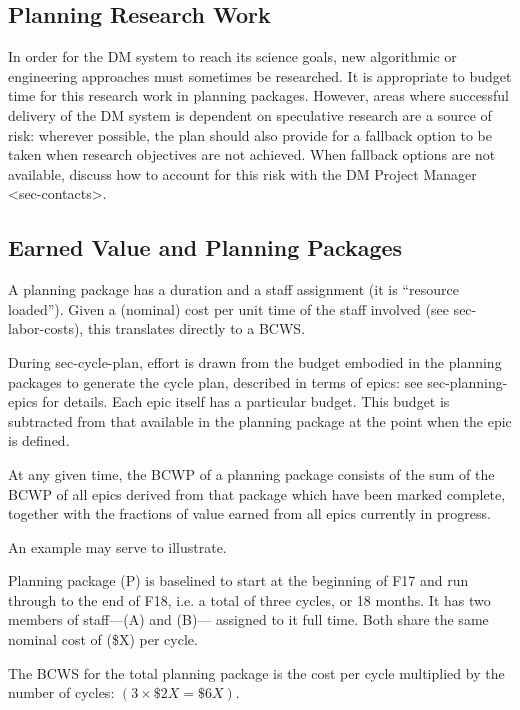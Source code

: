 \subsection{Planning Research Work}\label{planning-research-work}

In order for the DM system to reach its science goals, new algorithmic
or engineering approaches must sometimes be researched. It is
appropriate to budget time for this research work in planning packages.
However, areas where successful delivery of the DM system is dependent
on speculative research are a source of risk: wherever possible, the
plan should also provide for a fallback option to be taken when research
objectives are not achieved. When fallback options are not available,
discuss how to account for this risk with the
DM Project Manager \textless{}sec-contacts\textgreater{}.

\subsection{Earned Value and Planning
Packages}\label{earned-value-and-planning-packages}

A planning package has a duration and a staff assignment (it is
``resource loaded''). Given a (nominal) cost per unit time of the staff
involved (see sec-labor-costs), this translates directly to a BCWS.

During sec-cycle-plan, effort is drawn from the budget embodied in the
planning packages to generate the cycle plan, described in terms of
epics: see sec-planning-epics for details. Each epic itself has a
particular budget. This budget is subtracted from that available in the
planning package at the point when the epic is defined.

At any given time, the BCWP of a planning package consists of the sum of
the BCWP of all epics derived from that package which have been marked
complete, together with the fractions of value earned from all epics
currently in progress.

An example may serve to illustrate.

Planning package (P) is baselined to start at the beginning of F17 and
run through to the end of F18, i.e. a total of three cycles, or 18
months. It has two members of staff---(A) and (B)--- assigned to it
full time. Both share the same nominal cost of (\$X) per cycle.

The BCWS for the total planning package is the cost per cycle multiplied
by the number of cycles: $(3 \times \$2X = \$6X)$.


